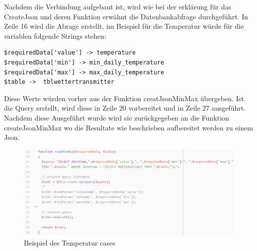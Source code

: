 Nachdem die Verbindung aufgebaut ist, wird wie bei der erklärung für das CreateJson und deren Funktion erwähnt die Datenbankabfrage durchgeführt. In Zeile 16 wird die Abrage erstellt, im Beispiel für die Temperatur würde für die variablen folgende Strings stehen:\\
\begin{lstlisting}
$requiredData['value'] -> temperature
$requiredData['min'] -> min_daily_temperature
$requiredData['max'] -> max_daily_temperature
$table ->  tblwettertransmitter
\end{lstlisting}
Diese Werte würden vorher aus der Funktion creatJsonMinMax übergeben. Ist die Query erstellt, wird diese in Zeile 20 vorbereitet und in Zeile 27 ausgeführt. Nachdem diese Ausgeführt wurde wird sie zurückgegeben an die Funktion createJsonMinMax wo die Resultate wie beschrieben aufbereitet werden zu einem Json. 

\begin{figure}[h!]
	\centering
	\includegraphics[width=1\linewidth]{img/API_temperature_code_databaseQuery}
	\caption{Beispiel des Temperatur cases}
	\label{img:wetterstation}
\end{figure}




